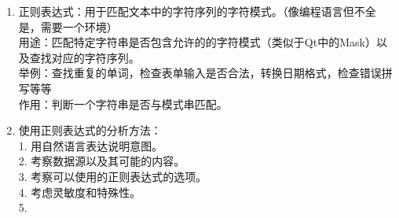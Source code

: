 \documentclass[a4paper]{article}
\begin{document}
\courseheader
{}

\begin{enumerate}
\setlength{\itemsep}{3\parskip}
\item 正则表达式：用于匹配文本中的字符序列的字符模式。（像编程语言但不全是，需要一个环境） \\
用途：匹配特定字符串是否包含允许的的字符模式（类似于Qt中的Mask）以及查找对应的字符序列。\\
举例：查找重复的单词，检查表单输入是否合法，转换日期格式，检查错误拼写等等\\
\BoldFont 作用：判断一个字符串是否与模式串匹配。\\

\item 使用正则表达式的分析方法：\\
1. 用自然语言表达说明意图。\\
2. 考察数据源以及其可能的内容。\\
3. 考察可以使用的正则表达式的选项。\\
4. 考虑灵敏度和特殊性。\\
5. 
\end{enumerate}
\end{document}
